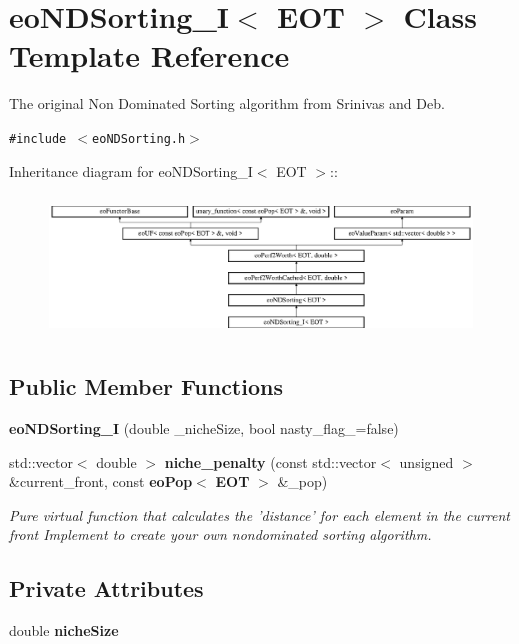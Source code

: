 \section{eo\-NDSorting\_\-I$<$ EOT $>$ Class Template Reference}
\label{classeo_n_d_sorting___i}
The original Non Dominated Sorting algorithm from Srinivas and Deb.  


{\tt \#include $<$eo\-NDSorting.h$>$}

Inheritance diagram for eo\-NDSorting\_\-I$<$ EOT $>$::\begin{figure}[H]
\begin{center}
\leavevmode
\includegraphics[height=3.78378cm]{classeo_n_d_sorting___i}
\end{center}
\end{figure}
\subsection*{Public Member Functions}
\begin{CompactItemize}
\item 
{\bf eo\-NDSorting\_\-I} (double \_\-niche\-Size, bool nasty\_\-flag\_\-=false)\label{classeo_n_d_sorting___i_a0}

\item 
std::vector$<$ double $>$ {\bf niche\_\-penalty} (const std::vector$<$ unsigned $>$ \&current\_\-front, const {\bf eo\-Pop}$<$ {\bf EOT} $>$ \&\_\-pop)
\begin{CompactList}\small\item\em Pure virtual function that calculates the 'distance' for each element in the current front Implement to create your own nondominated sorting algorithm. \item\end{CompactList}\end{CompactItemize}
\subsection*{Private Attributes}
\begin{CompactItemize}
\item 
double {\bf niche\-Size}\label{classeo_n_d_sorting___i_r0}

\end{CompactItemize}



